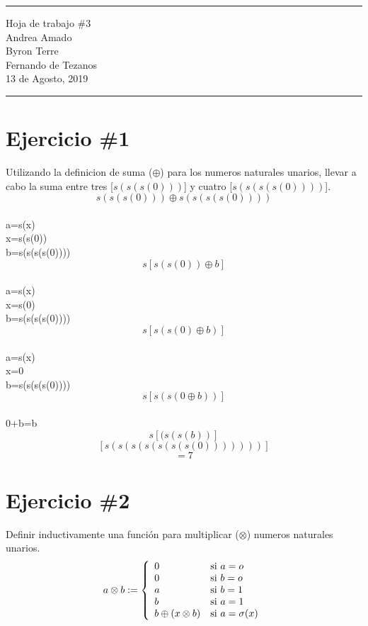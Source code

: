 \documentclass{article}
\newcommand{\horrule}[1]{\rule{\linewidth}{#1}}
\begin{document}
\begin{center}
        \horrule{0.5pt}
        \huge{Hoja de trabajo \#3} \\
        \large{Andrea Amado}\\
        \large{Byron Terre}\\
        \large{Fernando de Tezanos}\\
        \large{13 de Agosto, 2019} \\
        \horrule{1pt}
\end{center}
\section*{Ejercicio \#1}
Utilizando la definicion de suma ($\oplus$) para los numeros naturales unarios, llevar
a cabo la suma entre tres [$s(s(s(0)))$] y cuatro [$s(s(s(s(0))))$].\\ 
\[
        s(s(s(0)))\oplus s(s(s(s(0))))
\]\\
        a=s(x)\\
        x=s(s(0))\\
        b=s(s(s(s(0))))
 \[
        s[s(s(0))\oplus b]
\] \\
        a=s(x)\\
        x=s(0)\\
        b=s(s(s(s(0))))
\[
        s[s(s(0)\oplus b)]
\]\\
        a=s(x)\\
        x=0\\
        b=s(s(s(s(0))))
\[
        s[s(s(0\oplus b))]
\]\\
0+b=b
\[
        s[(s(s(b))]
\]
\[
        [s(s(s(s(s(s(s(0)))))))]
\]
\[
        =7
\]
\section*{Ejercicio \#2}
Definir inductivamente una funci\'on para multiplicar ($\otimes$) numeros naturales unarios.
\[
        a\otimes b := \left\{
        \begin{array}{l l}
            0 & \mbox{si } a=o \\
            0 & \mbox{si } b=o \\
            a & \mbox{si } b=1 \\
            b & \mbox{si } a=1 \\
            b\oplus(x\otimes b) & \mbox{si } a=\sigma(x) \\
        \end{array}
        \right.
    \]
\end{document}
